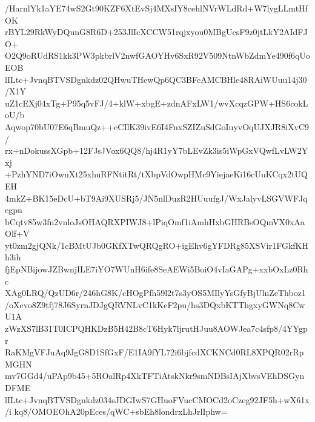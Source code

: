 /HarnlYk1aYE74wS2Gt90KZF6XtEvSj4MXsIY8cehlNVrWLdRd+W7lygLLmtHfOK
rBYL29RkWyDQunG8R6D+253JlIcXCCW51rqjxyou0MBgUcsF9z0jtLkY2AIdFJO+
O2Q9oRUdRS1kk3PW3pkbrlV2nwfGAOYHv6SxR92V509NtnWbZdmYe490f6qUoEOB
lILtc+JvnqBTVSDgnkdz02QHwuTHewQp6QC3BFcAMCBHle48RAiWUuu14j30/X1Y
uZ1cEXj04xTg+P95q5vFJ/4+klW+xbgE+zdnAFxLW1/wvXcqzGPW+HS6cokLoU/b
Aqwop70bU07E6qBmuQz++eCIlK39ivE6I4FnxSZIZuSdGoIuyvOqUJXJR8iXvC9/
rx+nDokussXGpb+12FJsJVox6QQ8/hj4R1yY7bLEvZk3is5iWpGxVQwfLvLW2Yxj
+PzhYND7iOwnXt25xhuRFNtitRt/tXbpVdOwpHMc9YiejaeKi16cUuKCqx2tUQEH
4mkZ+BK15eDcU+bT9Ai9XUSRj5/JN5nlDuzR2HUuufgJ/WxJalyvLSGVWFJqegpn
bCqtv85w3fn2vnloJsOHAQRXPIWJ8+lPiqOmf1iAmhHxbGHRBsOQmVX0xAaOlf+V
yt0zm2gjQNk/1cBMtUJb0GKfXTwQRQgRO+igEhv6gYFDRg85XSVir1FGkfKHh3ih
fjEpNBijowJZBwnjILE7iYO7WUnH6ife8SeAEWi5BoiO4vIaGAPg+xxbOxLz0Rhc
XAg0LRQ/QzUD6r/246hG8K/cHOgPfh59l2t7s3yOS5MIlyYsGfyBjUlnZeThboz1
/oXevo8Z9tfj78J6SyrnJDJgQRVNLvC1kKeF2pu/hs3DQxbKTThgxyGWNq8CwU1A
zWzXS7lB31T0ICPQHKDzB5H42B8cT6Hyk7ljrutHJuu8AOWJea7c4sfp8/4YYgpr
RaKMgVFJuAq9JgG8D1SfGxF/E1IA9fYL72i6bjfcdXCKNCd0RL8XPQR02rRpMGHN
mv7GGd4/uPAp9b45+5ROalRp4XkTFTiAtskNkr9smNDBsIAjXbvsVEhDSGynDFME
lILtc+JvnqBTVSDgnkdz034sJDGIwS7GHuoFVucCMOCd2oCzeg92JF5h+wX61x/i
kq8/OMOEOhA20pEces/qWC+sbEh8londrxLhJrlIphw=

